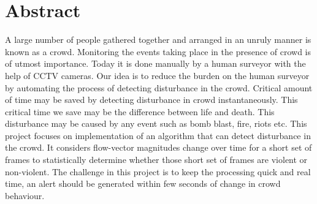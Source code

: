 \cleardoublepage
{}
{}
\chapter*{Abstract}
\vspace{0.2in}
A large number of people gathered together and arranged in an unruly manner is known as a crowd. Monitoring the events taking place in the presence of crowd is of utmost importance. Today it is done manually by a human surveyor with the help of CCTV cameras. Our idea is to reduce the burden on the human surveyor by automating the process of detecting disturbance in the crowd. Critical amount of time may be saved by detecting disturbance in crowd instantaneously. This critical time we save may be the difference between life and death. This disturbance may be caused by any event such as bomb blast, fire, riots etc. This project focuses on implementation of an algorithm that can detect disturbance in the crowd. It considers flow-vector magnitudes change over time for a short set of frames to statistically determine whether those short set of frames are violent or non-violent. The challenge in this project is to keep the processing quick and real time, an alert should be generated within few seconds of change in crowd behaviour. 


 
